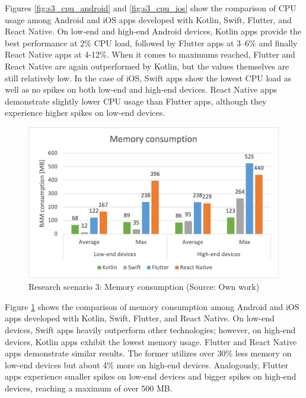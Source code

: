 Figures \ref{fig:s3_cpu_android} and \ref{fig:s3_cpu_ios} show the comparison of CPU usage among Android and iOS apps developed with Kotlin, Swift, Flutter, and React Native. On low-end and high-end Android devices, Kotlin apps provide the best performance at 2\% CPU load, followed by Flutter apps at 3--6\% and finally React Native apps at 4-12\%. When it comes to maximums reached, Flutter and React Native are again outperformed by Kotlin, but the values themselves are still relatively low. In the case of iOS, Swift apps show the lowest CPU load as well as no spikes on both low-end and high-end devices. React Native apps demonstrate slightly lower CPU usage than Flutter apps, although they experience higher spikes on low-end devices.

\begin{figure}[H]
    \centering
    \includegraphics[width=.6\textwidth]{img/scenario3_ram}
    \caption{Research scenario 3: Memory consumption (Source: Own work)}
    \label{fig:s3_ram}
\end{figure}

Figure \ref{fig:s3_ram} shows the comparison of memory consumption among Android and iOS apps developed with Kotlin, Swift, Flutter, and React Native. On low-end devices, Swift apps heavily outperform other technologies; however, on high-end devices, Kotlin apps exhibit the lowest memory usage. Flutter and React Native apps demonstrate similar results. The former utilizes over 30\% less memory on low-end devices but about 4\% more on high-end devices. Analogously, Flutter apps experience smaller spikes on low-end devices and bigger spikes on high-end devices, reaching a maximum of over 500 MB.
